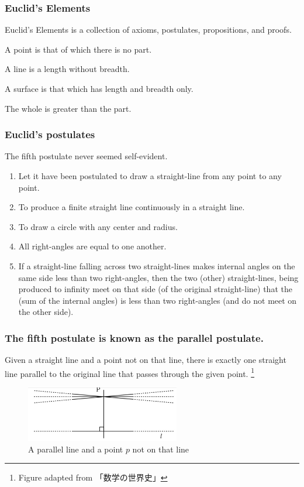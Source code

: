 \documentclass[unicode, 14pt, aspectratio=169]{beamer}
\newcommand\blfootnote[1]{%
  \begingroup
  \renewcommand\thefootnote{}\footnote{#1}%
  \addtocounter{footnote}{-1}%
  \endgroup
}
\begin{document}
\begin{frame}
  \frametitle{Euclid's Elements}
  {\large Euclid's Elements is a collection of axioms, postulates, propositions, and proofs.}
  \par
  \vspace{16pt}
  \begin{description}[leftmargin=0cm]
  \item[Definition 1] A point is that of which there is no part.
  \item[Definition 2] A line is a length without breadth.
  \item[Definition 3] A surface is that which has length and breadth only.
  \item[Axiom 5] The whole is greater than the part.
  \end{description}
\end{frame}
\begin{frame}
  \frametitle{Euclid's postulates}
  {\large The fifth postulate never seemed self-evident.}
  \par
  {\footnotesize
  \begin{enumerate}
  \item Let it have been postulated to draw a straight-line from any point to any point.
  \item To produce a finite straight line continuously in a straight line.
  \item To draw a circle with any center and radius.
  \item All right-angles are equal to one another.
  \item If a straight-line falling across two straight-lines makes internal angles on the same side less than two right-angles, then the two (other) straight-lines, being produced to infinity meet on that side (of the original straight-line) that the (sum of the internal angles) is less than two right-angles (and do not meet on the other side).
  \end{enumerate}
  }
\end{frame}
\begin{frame}
  \frametitle{The fifth postulate is known as the parallel postulate.}
  {\large Given a straight line and a point not on that line, there is exactly one straight line parallel to the original line that passes through the given point.}
  \blfootnote{Figure adapted from 「数学の世界史」\supercite{suugaku-no-sekaishi}}
  \begin{figure}
    \includegraphics[width=0.6\textwidth]{images/axiom5.png}
    \caption{A parallel line and a point $p$ not on that line}
  \end{figure}
\end{frame}
\end{document}
